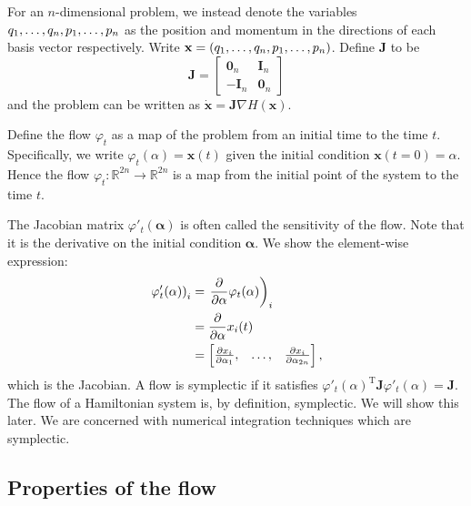 \documentclass{report}
\theoremstyle{exampstyle} \newtheorem{example}[theorem]{Example}
\theoremstyle{exampstyle} \newtheorem{remark}[theorem]{Remark}
\theoremstyle{exampstyle} \newtheorem{definition}[theorem]{Definition}
\theoremstyle{exampstyle} \newtheorem{lemma}[theorem]{Lemma}
\begin{document}
For an $n$-dimensional problem,
we instead denote the variables $q_1, \mathellipsis, q_n, p_1, \mathellipsis, p_n$ as the position and momentum in the directions of each basis vector respectively.
Write $\mathbf{x} = (q_1, \mathellipsis, q_n, p_1, \mathellipsis, p_n)$.
Define $\mathbf{J}$ to be
\begin{equation}
	\mathbf{J} = \begin{bmatrix}
		\mathbf{0}_n & \mathbf{I}_n \\
		-\mathbf{I}_n & \mathbf{0}_n
	\end{bmatrix}
\end{equation}
and the problem can be written as $\mathbf{\dot{x}} = \mathbf{J}\nabla H(\mathbf{x})$.

Define the flow $\varphi_t$ as a map of the problem from an initial time to the time $t$.
Specifically, we write $\varphi_t(\alpha) = \mathbf{x}(t)$ given the initial condition $\mathbf{x}(t=0) = \alpha$. Hence the flow $\varphi_t:\mathds{R}^{2n}\rightarrow \mathds{R}^{2n}$ is a map from the initial point of the system to the time $t$.

The Jacobian matrix $\varphi'_t(\mathbf{\alpha})$ is often called the sensitivity of the flow.
Note that it is the derivative on the initial condition $\mathbf{\alpha}$.
We show the element-wise expression:
\begin{align*}
	\left. \varphi'_t(\alpha) \right)_i &= \left. \frac{\partial}{\partial \alpha} \varphi_t(\alpha) \right)_i \\
	&= \frac{\partial}{\partial \alpha} x_i(t) \\
	&= \begin{bmatrix}
		\frac{\partial x_i}{\partial \alpha_1}, & \mathellipsis, & \frac{\partial x_i}{\partial \alpha_{2n}}
	\end{bmatrix},
\end{align*}
which is the Jacobian.
A flow is symplectic if it satisfies $\varphi'_t(\alpha)^\mathrm{T} \mathbf{J} \varphi'_t(\alpha) = \mathbf{J}.$
The flow of a Hamiltonian system is, by definition, symplectic. We will show this later.
We are concerned with numerical integration techniques which are symplectic.

\subsection{Properties of the flow}
\end{document}
